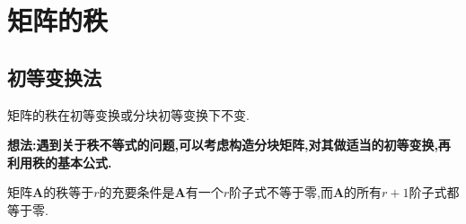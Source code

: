 \documentclass[../../main.tex]{subfiles}
\begin{document}
\everymath{\displaystyle} %

\section{矩阵的秩}

\subsection{初等变换法}

矩阵的秩在初等变换或分块初等变换下不变.

\textbf{想法:遇到关于秩不等式的问题,可以考虑构造分块矩阵,对其做适当的初等变换,再利用秩的基本公式.}

\begin{theorem}\label{theorem:矩阵的秩与子式}
矩阵\(\boldsymbol{A}\)的秩等于\(r\)的充要条件是\(\boldsymbol{A}\)有一个\(r\)阶子式不等于零,而\(\boldsymbol{A}\)的所有\(r + 1\)阶子式都等于零.
\end{theorem}
\end{document}
